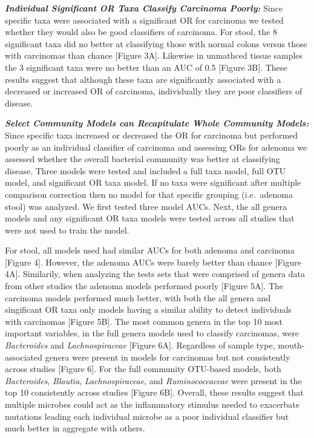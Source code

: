 \documentclass[12pt,]{article}
\begin{document}
\textbf{\emph{Individual Significant OR Taxa Classify Carcinoma
Poorly:}} Since specific taxa were associated with a significant OR for
carcinoma we tested whether they would also be good classifiers of
carcinoma. For stool, the 8 significant taxa did no better at
classifying those with normal colons versus those with carcinomas than
chance {[}Figure 3A{]}. Likewise in unmathced tissue samples the 3
significant taxa were no better than an AUC of 0.5 {[}Figure 3B{]}.
These results suggest that although these taxa are significantly
associated with a decreased or increased OR of carcinoma, individually
they are poor classifiers of disease.

\textbf{\emph{Select Community Models can Recapitulate Whole Community
Models:}} Since specific taxa increased or decreased the OR for
carcinoma but performed poorly as an individual classifier of carcinoma
and assessing ORs for adenoma we assessed whether the overall bacterial
community was better at classifying disease. Three models were tested
and included a full taxa model, full OTU model, and significant OR taxa
model. If no taxa were significant after multiple comparison correction
then no model for that specific grouping (i.e.~adenoma stool) was
analyzed. We first tested three model AUCs. Next, the all genera models
and any significant OR taxa models were tested across all studies that
were not used to train the model.

For stool, all models used had similar AUCs for both adenoma and
carcinoma {[}Figure 4{]}. However, the adenoma AUCs were barely better
than chance {[}Figure 4A{]}. Similarily, when analyzing the tests sets
that were comprised of genera data from other studies the adenoma models
performed poorly {[}Figure 5A{]}. The carcinoma models performed much
better, with both the all genera and singificant OR taxa only models
having a similar ability to detect individuals with carcinomas {[}Figure
5B{]}. The most common genera in the top 10 most important variables, in
the full genera models used to classify carcinomas, were
\emph{Bacteroides} and \emph{Lachnospiraceae} {[}Figure 6A{]}.
Regardless of sample type, mouth-associated genera were present in
models for carcinomas but not consistently across studies {[}Figure
6{]}. For the full community OTU-based models, both \emph{Bacteroides},
\emph{Blautia}, \emph{Lachnospiraceae}, and \emph{Ruminococcaceae} were
present in the top 10 consistently across studies {[}Figure 6B{]}.
Overall, these results suggest that multiple microbes could act as the
inflammatory stimulus needed to exacerbate mutations leading each
individual microbe as a poor individual classifier but much better in
aggregate with others.
\end{document}
